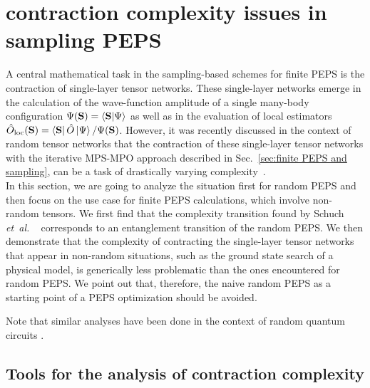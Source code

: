 \documentclass[aps,notitlepage,twocolumn,nofootinbib,superscriptaddress,pra,10pt]{revtex4-2}
\newcommand{\etal}{\textit{et~al.} }
\begin{document}

\section{contraction complexity issues in sampling PEPS}
\label{sec:contraction complexity issues in sampling PEPS}

A central mathematical task in the sampling-based schemes for finite PEPS is the contraction of single-layer tensor networks. 
These single-layer networks emerge in the calculation of the wave-function amplitude of a single many-body configuration $\Psi(\textbf{S}) = \braket{\textbf{S}|\Psi}$ as well as in the evaluation of local estimators $\hat{O}_{\text{loc}}(\textbf{S}) = \bra{\textbf{S}}\hat{O}\ket{\Psi}/\Psi(\textbf{S})$. 
However, it was recently discussed in the context of random tensor networks that the contraction of these single-layer tensor networks with the iterative MPS-MPO approach described in Sec.~\ref{sec:finite PEPS and sampling}, can be a task of drastically varying complexity~\cite{chen2024signproblem}.\\

In this section, we are going to analyze the situation first for random PEPS and then focus on the use case for finite PEPS calculations, which involve non-random tensors. 
We first find that the complexity transition found by Schuch \etal~\cite{chen2024signproblem} corresponds to an entanglement transition of the random PEPS.
We then demonstrate that the complexity of contracting the single-layer tensor networks that appear in non-random situations, such as the ground state search of a physical model, is generically less problematic than the ones encountered for random PEPS. 
We point out that, therefore, the naive random PEPS as a starting point of a PEPS optimization should be avoided. 

Note that similar analyses have been done in the context of random quantum circuits \cite{mcginley2024measurement}.

\subsection{Tools for the analysis of contraction complexity}
\end{document}
